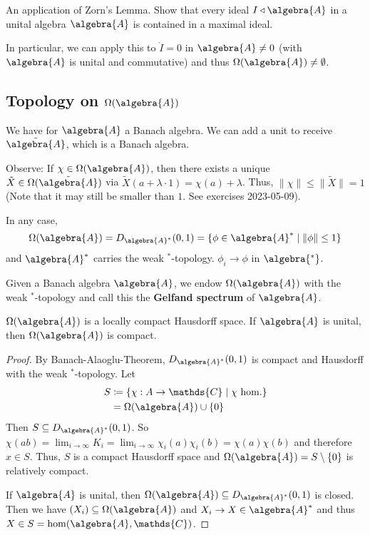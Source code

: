 \documentclass[a4paper]{article}
\begin{document}
\begin{exercise}
	An application of Zorn's Lemma. Show that every ideal $I \triangleleft \algebra{A}$ in a unital algebra $\algebra{A}$ is contained in a maximal ideal.
\end{exercise}

In particular, we can apply this to $\ring{I} = 0$ in $\algebra{A} \neq 0$ (with $\algebra{A}$ is unital and commutative) and thus $\Omega(\algebra{A}) \neq \emptyset$.

\subsection*{Topology on $\Omega(\algebra{A})$}

We have for $\algebra{A}$ a Banach algebra. We can add a unit to receive $\tilde{\algebra{A}}$, which is a Banach algebra.

Observe: If $\chi \in \Omega(\algebra{A})$, then there exists a unique $\tilde{X} \in \Omega(\tilde{\algebra{A}})$ via $\tilde{X}(a + \lambda \cdot 1) = \chi(a) + \lambda$. Thus, $\|\chi\| \leq \|\tilde{X}\| = 1$ (Note that it may still be smaller than $1$. See exercises 2023-05-09).

In any case, 
\begin{equation*}
	\Omega(\algebra{A}) = D_{\algebra{A}^*}(0,1) = \{ \phi \in \algebra{A}^* \mid \| \phi \| \leq 1 \}
\end{equation*}
and $\algebra{A}^*$ carries the weak $^*$-topology. $\phi_i \to \phi$ in $\algebra{^*}$. 

\begin{definition}
	Given a Banach algebra $\algebra{A}$, we endow $\Omega(\algebra{A})$ with the weak $^*$-topology and call this the \textbf{Gelfand spectrum} of $\algebra{A}$.
\end{definition}

\begin{proposition}
	$\Omega(\algebra{A})$ is a locally compact Hausdorff space. If $\algebra{A}$ is unital, then $\Omega(\algebra{A})$ is compact.
\end{proposition}

\begin{proof}
	By Banach-Alaoglu-Theorem, $D_{\algebra{A}^*}(0,1)$ is compact and Hausdorff with the weak $^*$-topology.
	Let
	\begin{align*}
		S &\coloneq \{\chi: A \to \mathds{C} \mid \chi \text{ hom.} \}\\
		&= \Omega(\algebra{A}) \cup \{0\}
	\end{align*}
	Then $S \subseteq D_{\algebra{A}^*}(0,1)$.
	So $\chi(ab) = \lim_{i \to \infty} K_i = \lim_{i \to \infty} \chi_i(a) \chi_i(b) = \chi(a) \chi(b)$ and therefore $x \in S$.
	Thus, $S$ is a compact Hausdorff space and $\Omega(\algebra{A}) = S \setminus \{0\}$ is relatively compact.

	If $\algebra{A}$ is unital, then $\Omega(\algebra{A}) \subseteq D_{\algebra{A}^*}(0,1)$ is closed. Then we have $(X_i) \subseteq \Omega(\algebra{A})$ and $X_i \to X \in \algebra{A}^*$ and thus $X \in S = \hom(\algebra{A}, \mathds{C})$.
\end{proof}
\end{document}
